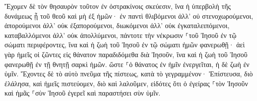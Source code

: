 \documentclass{openreader}
\begin{document}
Ἔχομεν δὲ τὸν θησαυρὸν τοῦτον ἐν ὀστρακίνοις σκεύεσιν, ἵνα ἡ ὑπερβολὴ τῆς δυνάμεως ᾖ τοῦ θεοῦ καὶ μὴ ἐξ ἡμῶν· 
ἐν παντὶ θλιβόμενοι ἀλλ’ οὐ στενοχωρούμενοι, ἀπορούμενοι ἀλλ’ οὐκ ἐξαπορούμενοι, 
διωκόμενοι ἀλλ’ οὐκ ἐγκαταλειπόμενοι, καταβαλλόμενοι ἀλλ’ οὐκ ἀπολλύμενοι, 
πάντοτε τὴν νέκρωσιν ⸀τοῦ Ἰησοῦ ἐν τῷ σώματι περιφέροντες, ἵνα καὶ ἡ ζωὴ τοῦ Ἰησοῦ ἐν τῷ σώματι ἡμῶν φανερωθῇ· 
ἀεὶ γὰρ ἡμεῖς οἱ ζῶντες εἰς θάνατον παραδιδόμεθα διὰ Ἰησοῦν, ἵνα καὶ ἡ ζωὴ τοῦ Ἰησοῦ φανερωθῇ ἐν τῇ θνητῇ σαρκὶ ἡμῶν. 
ὥστε ⸀ὁ θάνατος ἐν ἡμῖν ἐνεργεῖται, ἡ δὲ ζωὴ ἐν ὑμῖν. 
Ἔχοντες δὲ τὸ αὐτὸ πνεῦμα τῆς πίστεως, κατὰ τὸ γεγραμμένον· Ἐπίστευσα, διὸ ἐλάλησα, καὶ ἡμεῖς πιστεύομεν, διὸ καὶ λαλοῦμεν, 
εἰδότες ὅτι ὁ ἐγείρας ⸀τὸν Ἰησοῦν καὶ ἡμᾶς ⸀σὺν Ἰησοῦ ἐγερεῖ καὶ παραστήσει σὺν ὑμῖν. 
\end{document}

